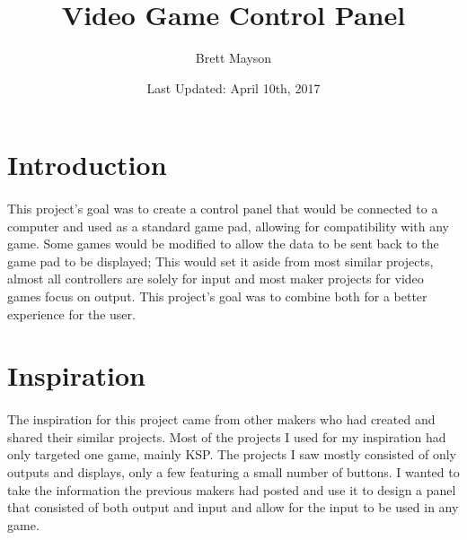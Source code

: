\documentclass[12pt,a4paper]{article}
\title{Video Game Control Panel}
\date{Last Updated: April 10th, 2017}
\author{Brett Mayson}
\begin{document}

	\maketitle
	\newpage
	\tableofcontents
	\newpage
	\listoffigures
  \printglossary[type=\acronymtype]
	\newpage

	\linespread{1.5}

	\section{Introduction}
		\paragraph{}
		This project's goal was to create a control panel that would be connected to a computer and used as a standard game pad, allowing for compatibility with any game. Some games would be modified to allow the data to be sent back to the game pad to be displayed; This would set it aside from most similar projects, almost all controllers are solely for input and most maker projects for video games focus on output. This project's goal was to combine both for a better experience for the user.
	\section{Inspiration}
		\paragraph{}
		The inspiration for this project came from other makers who had created and shared their similar projects. Most of the projects I used for my inspiration had only targeted one game, mainly \gls{KSP}. The projects I saw mostly consisted of only outputs and displays, only a few featuring a small number of buttons. I wanted to take the information the previous makers had posted and use it to design a panel that consisted of both output and input and allow for the input to be used in any game.
\end{document}
